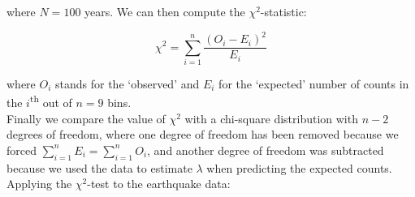 \noindent where $N=100$ years. We can then compute the
$\chi^2$-statistic:

\begin{equation}
  \chi^2 = \sum\limits_{i=1}^{n} \frac{(O_i-E_i)^2}{E_i}
  \label{eq:chi2}
\end{equation}

\noindent where $O_i$ stands for the `observed' and $E_i$ for the
`expected' number of counts in the $i$\textsuperscript{th} out of
$n=9$ bins.\\

Finally we compare the value of $\chi^2$ with a chi-square
distribution with $n-2$ degrees of freedom, where one degree of
freedom has been removed because we forced
$\sum_{i=1}^nE_i=\sum_{i=1}^nO_i$, and another degree of freedom was
subtracted because we used the data to estimate $\lambda$ when
predicting the expected counts.\\

Applying the $\chi^2$-test to the earthquake data:

